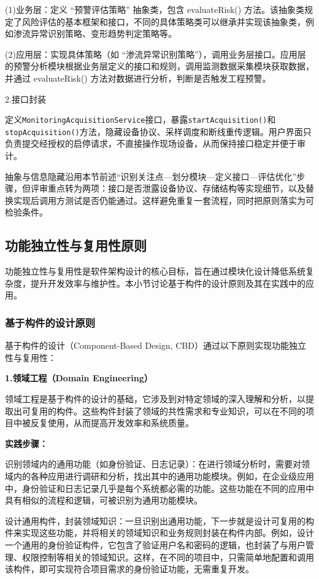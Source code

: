 (1)业务层：定义 “预警评估策略” 抽象类，包含 evaluateRisk() 方法。该抽象类规定了风险评估的基本框架和接口，不同的具体策略类可以继承并实现该抽象类，例如渗流异常识别策略、变形趋势判定策略等。

(2)应用层：实现具体策略（如 “渗流异常识别策略”），调用业务层接口。应用层的预警分析模块根据业务层定义的接口和规则，调用监测数据采集模块获取数据，并通过 evaluateRisk() 方法对数据进行分析，判断是否触发工程预警。

2.接口封装

定义\texttt{MonitoringAcquisitionService}接口，暴露\texttt{startAcquisition()}和\texttt{stopAcquisition()}方法，隐藏设备协议、采样调度和断线重传逻辑。用户界面只负责提交经授权的启停请求，不直接操作现场设备，从而保持接口稳定并便于审计。

抽象与信息隐藏沿用本节前述“识别关注点—划分模块—定义接口—评估优化”步骤，但评审重点转为两项：接口是否泄露设备协议、存储结构等实现细节，以及替换实现后调用方测试是否仍能通过。这样避免重复一套流程，同时把原则落实为可检验条件。

\subsection{功能独立性与复用性原则}

功能独立性与复用性是软件架构设计的核心目标，旨在通过模块化设计降低系统复杂度，提升开发效率与维护性。本小节讨论基于构件的设计原则及其在实践中的应用。

\subsubsection{基于构件的设计原则}
基于构件的设计（Component-Based Design, CBD）通过以下原则实现功能独立性与复用性：

\textbf{1.领域工程（Domain Engineering）}

领域工程是基于构件的设计的基础，它涉及到对特定领域的深入理解和分析，以提取出可复用的构件。这些构件封装了领域的共性需求和专业知识，可以在不同的项目中被反复使用，从而提高开发效率和系统质量。

\textbf{实践步骤：}

识别领域内的通用功能（如身份验证、日志记录）：在进行领域分析时，需要对领域内的各种应用进行调研和分析，找出其中的通用功能模块。例如，在企业级应用中，身份验证和日志记录几乎是每个系统都必需的功能。这些功能在不同的应用中具有相似的流程和逻辑，可被识别为通用功能模块。

设计通用构件，封装领域知识：一旦识别出通用功能，下一步就是设计可复用的构件来实现这些功能，并将相关的领域知识和业务规则封装在构件内部。例如，设计一个通用的身份验证构件，它包含了验证用户名和密码的逻辑，也封装了与用户管理、权限控制等相关的领域知识。这样，在不同的项目中，只需简单地配置和调用该构件，即可实现符合项目需求的身份验证功能，无需重复开发。

